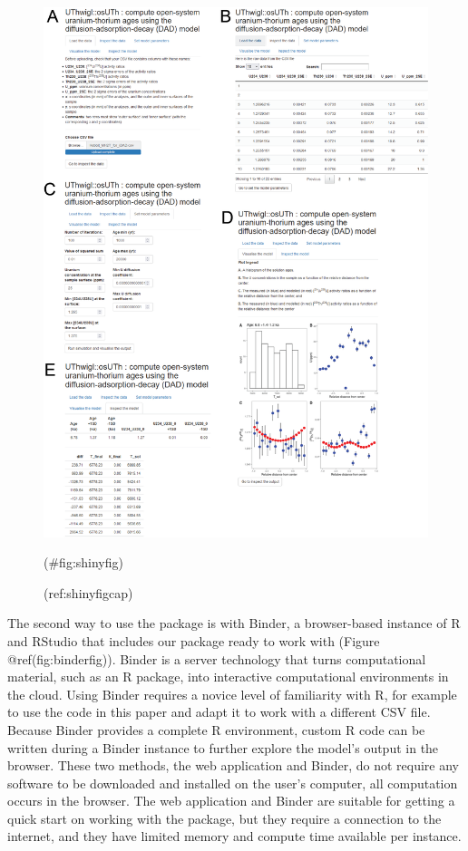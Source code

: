 \documentclass[]{elsarticle} %
\begin{document}
\begin{figure}
\includegraphics[width=0.95\linewidth]{figures/shiny-app-screenshots} \caption{(ref:shinyfigcap)}(\#fig:shinyfig)
\end{figure}

The second way to use the package is with Binder, a browser-based instance of R and RStudio that includes our package ready to work with (Figure @ref(fig:binderfig)). Binder is a server technology that turns computational material, such as an R package, into interactive computational environments in the cloud. Using Binder requires a novice level of familiarity with R, for example to use the code in this paper and adapt it to work with a different CSV file. Because Binder provides a complete R environment, custom R code can be written during a Binder instance to further explore the model's output in the browser. These two methods, the web application and Binder, do not require any software to be downloaded and installed on the user's computer, all computation occurs in the browser. The web application and Binder are suitable for getting a quick start on working with the package, but they require a connection to the internet, and they have limited memory and compute time available per instance.
\end{document}
